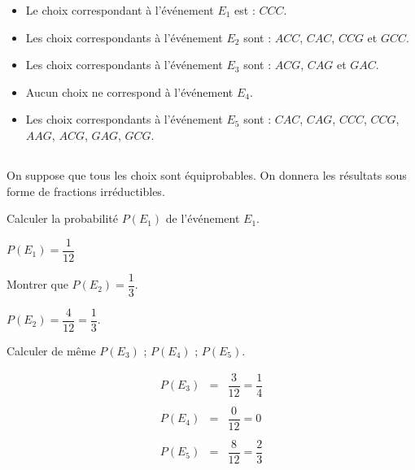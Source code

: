 \begin{questions}
	\begin{solution}
		\begin{itemize}
			\item Le choix correspondant à l'événement $E_1$ est : $CCC$.
			\item Les choix correspondants à l'événement $E_2$ sont : $ACC$, $CAC$, $CCG$ et $GCC$.
			\item Les choix correspondants à l'événement $E_3$ sont : $ACG$, $CAG$ et $GAC$.
			\item Aucun choix ne correspond à l'événement $E_4$.
			\item Les choix correspondants à l'événement $E_5$ sont : $CAC$, $CAG$, $CCC$, $CCG$, $AAG$, $ACG$, $GAG$, $GCG$.
		\end{itemize}
	\end{solution}
\end{questions}

\subsection{}

On suppose que tous les choix sont équiprobables. On donnera les résultats sous forme de fractions irréductibles.

\begin{questions}
	\question[1] Calculer la probabilité $P(E_1)$ de l'événement $E_1$.
	\begin{solution}
		$P(E_1)=\dfrac{1}{12}$
	\end{solution}
	
	\question[1] Montrer que $P(E_2)=\dfrac{1}{3}$.
	 \begin{solution}
	 	$P(E_2)=\dfrac{4}{12}=\dfrac{1}{3}$.
	 \end{solution}
	
	\question[2] Calculer de même $P(E_3)$ ; $P(E_4)$ ; $P(E_5)$.
	\begin{solution}
		\begin{eqnarray*}
			P(E_3) &=& \dfrac{3}{12} = \dfrac{1}{4} \\
			 & & \\
			P(E_4) &=& \dfrac{0}{12} = 0 \\
			& & \\
			P(E_5) &=& \dfrac{8}{12} = \dfrac{2}{3} 
		\end{eqnarray*}
	\end{solution}
\end{questions} 